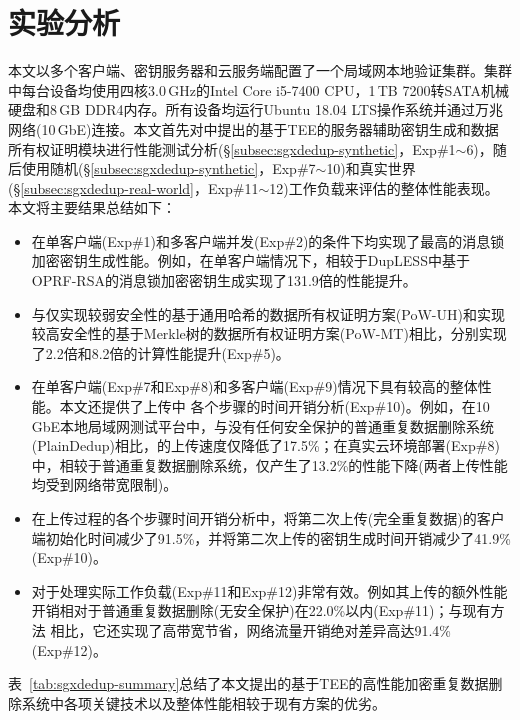 \section{实验分析}
\label{sec:sgxdedup-evaluation}

本文以多个客户端、密钥服务器和云服务端配置了一个局域网本地验证集群。集群中每台设备均使用四核3.0\,GHz的Intel Core i5-7400 CPU，1\,TB 7200转SATA机械硬盘和8\,GB DDR4内存。所有设备均运行Ubuntu 18.04 LTS操作系统并通过万兆网络(10\,GbE)连接。本文首先对\sysnameS 中提出的基于TEE的服务器辅助密钥生成和数据所有权证明模块进行性能测试分析(\S\ref{subsec:sgxdedup-synthetic}，Exp\#1$\sim$6)，随后使用随机(\S\ref{subsec:sgxdedup-synthetic}，Exp\#7$\sim$10)和真实世界(\S\ref{subsec:sgxdedup-real-world}，Exp\#11$\sim$12)工作负载来评估\sysnameS 的整体性能表现。本文将主要结果总结如下：

\begin{itemize}[leftmargin=0em]
    \item \sysnameS 在单客户端(Exp\#1)和多客户端并发(Exp\#2)的条件下均实现了最高的消息锁加密密钥生成性能。例如，在单客户端情况下，相较于DupLESS\cite{bellare2013DupLESS}中基于OPRF-RSA的消息锁加密密钥生成实现了131.9倍的性能提升。
    \item \sysnameS 与仅实现较弱安全性的基于通用哈希的数据所有权证明方案(PoW-UH)\cite{xu2013weak}和实现较高安全性的基于Merkle树的数据所有权证明方案(PoW-MT)\cite{halevi11}相比，分别实现了2.2倍和8.2倍的计算性能提升(Exp\#5)。
    \item \sysnameS 在单客户端(Exp\#7和Exp\#8)和多客户端(Exp\#9)情况下具有较高的整体性能。本文还提供了上传中 \sysnameS 各个步骤的时间开销分析(Exp\#10)。例如，在10\,GbE本地局域网测试平台中，与没有任何安全保护的普通重复数据删除系统(PlainDedup)相比，\sysnameS 的上传速度仅降低了17.5\%；在真实云环境部署(Exp\#8)中，相较于普通重复数据删除系统，\sysnameS 仅产生了13.2\%的性能下降(两者上传性能均受到网络带宽限制)。
    \item 在上传过程的各个步骤时间开销分析中，\sysnameS 将第二次上传(完全重复数据)的客户端初始化时间减少了91.5\%，并将第二次上传的密钥生成时间开销减少了41.9\%(Exp\#10)。
    \item \sysnameS 对于处理实际工作负载(Exp\#11和Exp\#12)非常有效。例如其上传的额外性能开销相对于普通重复数据删除(无安全保护)在22.0\%以内(Exp\#11)；与现有方法\cite{li15,harnik2010side} 相比，它还实现了高带宽节省，网络流量开销绝对差异高达91.4\%(Exp\#12)。
\end{itemize}

表~\ref{tab:sgxdedup-summary}总结了本文提出的基于TEE的高性能加密重复数据删除系统\sysnameS 中各项关键技术以及整体性能相较于现有方案的优劣。

